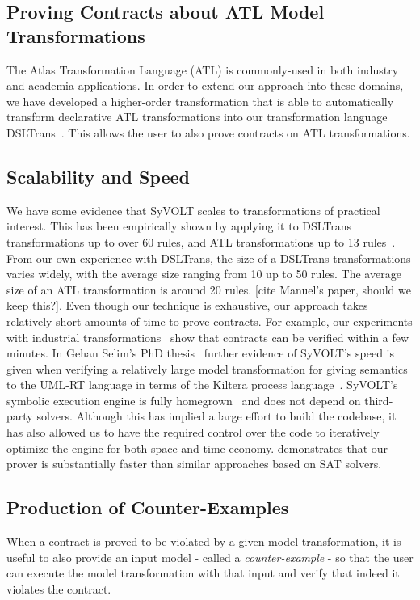 \subsection{Proving Contracts about ATL Model Transformations}
The Atlas Transformation Language (ATL) is commonly-used in both industry and
academia applications. In order to extend our approach into these domains, we
have developed a higher-order transformation that is able to automatically
transform declarative ATL transformations into our transformation language
DSLTrans~\cite{Oakes}. This allows the user to also prove contracts on
ATL transformations.

\subsection{Scalability and Speed}

We have some evidence that SyVOLT scales to transformations of practical
interest. This has been empirically shown by applying it to DSLTrans
transformations up to over 60 rules, and ATL transformations up to 13
rules~\cite{Oakes}. From our own experience with DSLTrans, the size of a
DSLTrans transformations varies widely, with the average size ranging from 10 up
to 50 rules. The average size of an ATL transformation is around 20 rules. [cite
Manuel's paper, should we keep this?].
Even though our technique is exhaustive, our approach takes relatively short
amounts of time to prove contracts. For example, our experiments with industrial
transformations~\cite{Oakes} show that contracts can be verified within a few
minutes. In Gehan Selim's PhD thesis~\cite{Selim2015}
further evidence of SyVOLT's speed is given when verifying a relatively large
model transformation for giving semantics to the UML-RT language in terms of
the Kiltera process language~\cite{PosseDingel2014}. SyVOLT's symbolic execution
engine is fully homegrown~\cite{LucioVang} and does not depend on third-party
solvers. Although this has implied a large effort to build the codebase, it has
also allowed us to have the required control over the code to iteratively
optimize the engine for both space and time economy. \cite{Selim2014}
demonstrates that our prover is substantially faster than similar approaches based on SAT solvers.


\subsection{Production of Counter-Examples}

When a contract is proved to be violated by a given model transformation, it is
useful to also provide an input model - called a \emph{counter-example} - so
that the user can execute the model transformation with that input and verify
that indeed it violates the contract.

